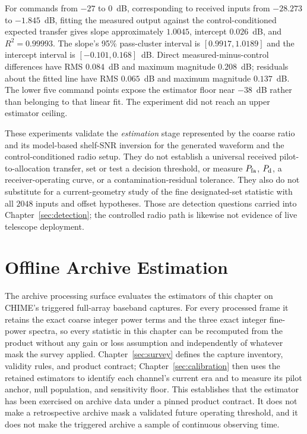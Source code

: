 For commands from $-27$ to $0$~dB, corresponding to received inputs from $-28.273$ to $-1.845$~dB, fitting the measured output against the control-conditioned expected transfer gives slope approximately $1.0045$, intercept $0.026$~dB, and $R^2=0.99993$. The slope's 95\% pass-cluster interval is $[0.9917,1.0189]$ and the intercept interval is $[-0.101,0.168]$~dB. Direct measured-minus-control differences have RMS $0.084$~dB and maximum magnitude $0.208$~dB; residuals about the fitted line have RMS $0.065$~dB and maximum magnitude $0.137$~dB. The lower five command points expose the estimator floor near $-38$~dB rather than belonging to that linear fit. The experiment did not reach an upper estimator ceiling.


These experiments validate the \emph{estimation} stage represented by the coarse ratio and its model-based shelf-SNR inversion for the generated waveform and the control-conditioned radio setup. They do not establish a universal received pilot-to-allocation transfer, set or test a decision threshold, or measure $P_{\rm fa}$, $P_{\rm d}$, a receiver-operating curve, or a contamination-residual tolerance. They also do not substitute for a current-geometry study of the fine designated-set statistic with all $2048$ inputs and offset hypotheses. Those are detection questions carried into Chapter~\ref{sec:detection}; the controlled radio path is likewise not evidence of live telescope deployment.

\clearpage

\section{Offline Archive Estimation}
\label{sec:estimator:archive}

The archive processing surface evaluates the estimators of this chapter on CHIME's triggered full-array baseband captures. For every processed frame it retains the exact coarse integer power terms and the three exact integer fine-power spectra, so every statistic in this chapter can be recomputed from the product without any gain or loss assumption and independently of whatever mask the survey applied. Chapter~\ref{sec:survey} defines the capture inventory, validity rules, and product contract; Chapter~\ref{sec:calibration} then uses the retained estimators to identify each channel's current era and to measure its pilot anchor, null population, and sensitivity floor. This establishes that the estimator has been exercised on archive data under a pinned product contract. It does not make a retrospective archive mask a validated future operating threshold, and it does not make the triggered archive a sample of continuous observing time.

